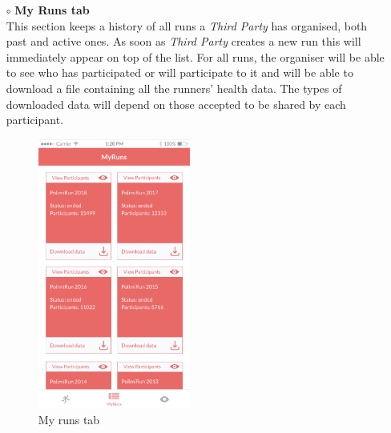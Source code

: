 \documentclass[titlepage]{article}
\begin{document}
\begin{itemize}
\begin{itemize}
\begin{itemize}
					\item[$\circ$] {\bf My Runs tab} \\
					This section keeps a history of all runs a {\it Third Party} has organised, both past and active ones. As soon as {\it Third Party} creates a new run this will immediately appear on top of the list. For all runs, the organiser will be able to see who has participated or will participate to it and will be able to download a file containing all the runners’ health data. The types of downloaded data will depend on those accepted to be shared by each participant. \\
					\begin{figure}[H]
						\center
  						\includegraphics[width=5cm]{Mockup/mockupMyRuns.png}
  						\caption{My runs tab}
 					 	\label{fig:MyRuns}
					\end{figure}


\end{itemize}
\end{itemize}
\end{itemize}
\end{document}
